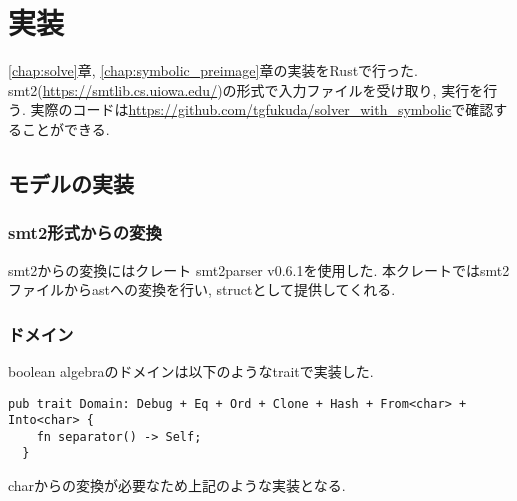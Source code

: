 \documentclass[uplatex,dvipdfmx,a4j]{jsreport}
\begin{document}
  \chapter{実装}  \label{chap:implementation}

  \ref{chap:solve}章, \ref{chap:symbolic_preimage}章の実装をRustで行った.
  smt2(\url{https://smtlib.cs.uiowa.edu/})の形式で入力ファイルを受け取り, 実行を行う.
  実際のコードは\url{https://github.com/tgfukuda/solver_with_symbolic}で確認することができる.

  \section{モデルの実装}

  \subsection{smt2形式からの変換}
  smt2からの変換にはクレート smt2parser v0.6.1を使用した.
  本クレートではsmt2ファイルからastへの変換を行い, structとして提供してくれる.

  \subsection{ドメイン}
  boolean algebraのドメインは以下のようなtraitで実装した.
  \begin{lstlisting}[caption=Domain, label=domain_impl]
  pub trait Domain: Debug + Eq + Ord + Clone + Hash + From<char> + Into<char> {
    fn separator() -> Self;
  }
  \end{lstlisting}
  charからの変換が必要なため上記のような実装となる.
\end{document}
